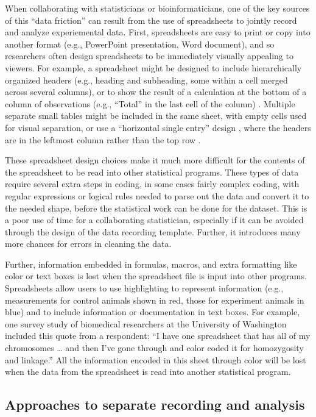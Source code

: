 \documentclass[]{tufte-book}
\begin{document}
When collaborating with statisticians or bioinformaticians, one of the key
sources of this ``data friction'' can result from the use of spreadsheets to
jointly record and analyze experiemental data. First, spreadsheets are easy to
print or copy into another format (e.g., PowerPoint presentation, Word
document), and so researchers often design spreadsheets to be immediately
visually appealing to viewers. For example, a spreadsheet might be designed to
include hierarchically organized headers (e.g., heading and subheading, some
within a cell merged across several columns), or to show the result of a
calculation at the bottom of a column of observations (e.g., ``Total'' in the last
cell of the column) \citep{teixeira2016emergence}. Multiple separate small tables
might be included in the same sheet, with empty cells used for visual
separation, or use a ``horizontal single entry'' design , where the headers are in
the leftmost column rather than the top row \citep{teixeira2016emergence}.

These spreadsheet design choices make it much more difficult for the contents of
the spreadsheet to be read into other statistical programs. These types of data
require several extra steps in coding, in some cases fairly complex coding, with
regular expressions or logical rules needed to parse out the data and convert it
to the needed shape, before the statistical work can be done for the dataset.
This is a poor use of time for a collaborating statistician, especially if it
can be avoided through the design of the data recording template. Further, it
introduces many more chances for errors in cleaning the data.

Further, information embedded in formulas, macros, and extra formatting like
color or text boxes is lost when the spreadsheet file is input into other
programs. Spreadsheets allow users to use highlighting to represent information
(e.g., measurements for control animals shown in red, those for experiment
animals in blue) and to include information or documentation in text boxes. For
example, one survey study of biomedical researchers at the University of
Washington included this quote from a respondent: ``I have one spreadsheet that
has all of my chromosomes \ldots{} and then I've gone through and color coded it for
homozygosity and linkage.'' \citep{anderson2007issues} All the information encoded in
this sheet through color will be lost when the data from the spreadsheet is read
into another statistical program.

\hypertarget{approaches-to-separate-recording-and-analysis}{%
\subsection{Approaches to separate recording and analysis}\label{approaches-to-separate-recording-and-analysis}}
\end{document}
